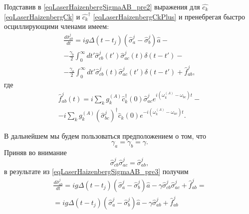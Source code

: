 Подставив в \eqref{eqLaserHaizenbergSigmaAB_pre2} выражения для
$\hat{c_k}$ \eqref{eqLaserHaizenbergCk} и $\hat{c_k}^{\dag}$
\eqref{eqLaserHaizenbergCkPlus} и пренебрегая быстро осциллирующими
членами имеем:
\begin{eqnarray}
\frac{d \hat{\sigma}_{ab}^j}{d t} = 
i g 
\Delta\left(t - t_j\right) 
\left(\hat{\sigma}^{j}_{a} -
\hat{\sigma}^{j}_{b}\right)\hat{a} -
\nonumber \\
- \frac{\gamma_{b}}{2}
\int_0^{\infty}dt'
\hat{\sigma}^{j}_{cb}\left(t'\right)  
\hat{\sigma}^{j}_{ac}\left(t\right) 
\delta\left(t - t'\right) -
\nonumber \\ 
- \frac{\gamma_{a}}{2}
\int_0^{\infty}dt'
\hat{\sigma}^{j}_{cb}\left(t\right)  
\hat{\sigma}^{j}_{ac}\left(t'\right) 
\delta\left(t - t'\right) + \hat{f}_{ab}^{j},
\label{eqLaserHaizenbergSigmaAB_pre3}
\end{eqnarray}
где
\begin{eqnarray}
\hat{f}_{ab}^{j}\left(t\right) = 
i
\sum_{k}
g_k^{(A)}
\hat{c}_k^{\dag}\left(0\right)
\hat{\sigma}^{j}_{ac}  
e^{i\left(\omega_k^{(A)} - \omega_{bc}\right)t} -
\nonumber \\
-
 i
\sum_{k}
g_k^{(A)}
\left(\hat{\sigma}^{j}_{bc}\right)^{\dag}\hat{c}_k\left(0\right)
e^{-i\left(\omega_k^{(A)} - \omega_{ac}\right)t}.
\label{eqLaserHaizenbergFABJ}
\end{eqnarray}

В дальнейшем мы будем пользоваться предположением о том, что
\begin{equation}
\gamma_{a} =
\gamma_{b} = \gamma.
\label{eqLaserHaizenbergGamma}
\end{equation}
Приняв во внимание
\[
\hat{\sigma}^{j}_{cb}\hat{\sigma}^{j}_{ac} = 
\hat{\sigma}^{j}_{ab},
\]
в результате из \eqref{eqLaserHaizenbergSigmaAB_pre3} получим 
\begin{eqnarray}
\frac{d \hat{\sigma}_{ab}^j}{d t} = 
i g 
\Delta\left(t - t_j\right) 
\left(\hat{\sigma}^{j}_{a} -
\hat{\sigma}^{j}_{b}\right)\hat{a} 
- \gamma \hat{\sigma}^{j}_{cb}\hat{\sigma}^{j}_{ac} 
 + \hat{f}_{ab}^{j} = 
\nonumber \\
= 
i g 
\Delta\left(t - t_j\right) 
\left(\hat{\sigma}^{j}_{a} -
\hat{\sigma}^{j}_{b}\right)\hat{a} 
- \gamma \hat{\sigma}^{j}_{ab} 
 + \hat{f}_{ab}^{j}
\label{eqLaserHaizenbergSigmaABJ}
\end{eqnarray}

